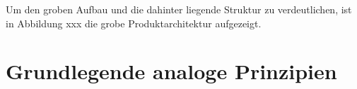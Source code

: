 Um den groben Aufbau und die dahinter liegende Struktur zu verdeutlichen, ist in Abbildung xxx die grobe Produktarchitektur aufgezeigt.


\section{Grundlegende analoge Prinzipien}
\label{sec:AnalogePrinzipien}



